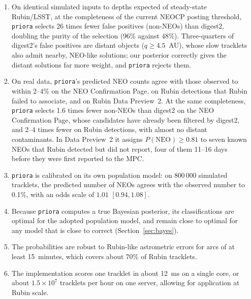 \documentclass[linenumbers,twocolumn]{aastex701}
\newcommand{\priora}{{\tt priora}\xspace} %
\begin{document}
\begin{enumerate}
    \item On identical simulated inputs to depths expected of steady-state Rubin/LSST, at the completeness of the current
    NEOCP posting threshold, \priora selects 26 times fewer false positives (non-NEOs) than
    digest2, doubling the purity of the selection (96\% against 48\%).
    Three-quarters of digest2's false positives are distant objects
    ($q\geq4.5$~AU), whose slow tracklets also admit nearby, NEO-like
    solutions; our posterior correctly gives the distant solutions far more
    weight, and \priora rejects them.

    \item On real data, \priora's predicted NEO counts agree with those observed
    to within 2--4\% on the NEO Confirmation Page, on Rubin detections that
    Rubin failed to associate, and on Rubin Data Preview~2. At the same completeness, \priora selects
    1.6 times fewer non-NEOs than digest2 on the NEO Confirmation Page, whose
    candidates have already been filtered by digest2, and 2--4 times fewer on
    Rubin detections, with almost no distant contaminants.
    In Data Preview~2 it assigns $P(\mathrm{NEO})\geq0.81$ to seven known NEOs
    that Rubin detected but did not report, four of them 11--16 days before
    they were first reported to the MPC.

    \item \priora is calibrated on its own population model: on 800\,000
    simulated tracklets, the predicted number of NEOs agrees with the
    observed number to 0.1\%, with an odds scale of $1.01$ $[0.94,1.08]$.

    \item Because \priora computes a true Bayesian posterior, its
    classifications are optimal for the adopted population model, and remain
    close to optimal for any model that is close to correct
    (Section~\ref{sec:bayes}).

    \item The probabilities are robust to Rubin-like astrometric errors for
    arcs of at least 15~minutes, which covers about 70\% of Rubin tracklets.

    \item The implementation scores one tracklet in about 12~ms on a single
    core, or about $1.5\times10^{7}$ tracklets per hour on one server, allowing
    for application at Rubin scale.

\end{enumerate}
\end{document}
